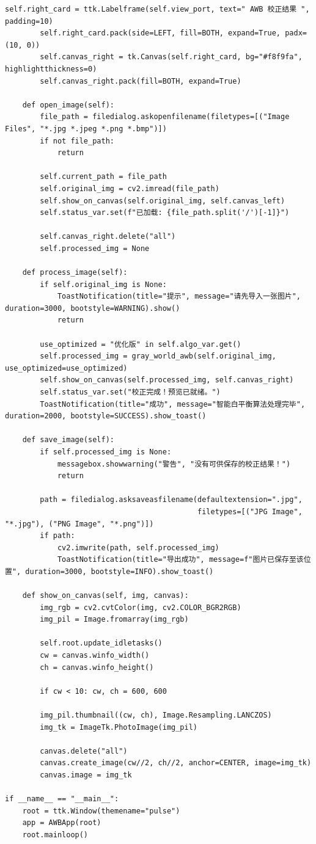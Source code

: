 \documentclass[12pt,a4paper,UTF8]{ctexart} %
\begin{document}
\begin{lstlisting}[caption={AWB可视化GUI代码（awb\_gui.py）}, label=code:gui]
        self.right_card = ttk.Labelframe(self.view_port, text=" AWB 校正结果 ", padding=10)
        self.right_card.pack(side=LEFT, fill=BOTH, expand=True, padx=(10, 0))
        self.canvas_right = tk.Canvas(self.right_card, bg="#f8f9fa", highlightthickness=0)
        self.canvas_right.pack(fill=BOTH, expand=True)

    def open_image(self):
        file_path = filedialog.askopenfilename(filetypes=[("Image Files", "*.jpg *.jpeg *.png *.bmp")])
        if not file_path:
            return
            
        self.current_path = file_path
        self.original_img = cv2.imread(file_path)
        self.show_on_canvas(self.original_img, self.canvas_left)
        self.status_var.set(f"已加载: {file_path.split('/')[-1]}")
        
        self.canvas_right.delete("all")
        self.processed_img = None

    def process_image(self):
        if self.original_img is None:
            ToastNotification(title="提示", message="请先导入一张图片", duration=3000, bootstyle=WARNING).show()
            return
            
        use_optimized = "优化版" in self.algo_var.get()
        self.processed_img = gray_world_awb(self.original_img, use_optimized=use_optimized)
        self.show_on_canvas(self.processed_img, self.canvas_right)
        self.status_var.set("校正完成！预览已就绪。")
        ToastNotification(title="成功", message="智能白平衡算法处理完毕", duration=2000, bootstyle=SUCCESS).show_toast()

    def save_image(self):
        if self.processed_img is None:
            messagebox.showwarning("警告", "没有可供保存的校正结果！")
            return
            
        path = filedialog.asksaveasfilename(defaultextension=".jpg", 
                                            filetypes=[("JPG Image", "*.jpg"), ("PNG Image", "*.png")])
        if path:
            cv2.imwrite(path, self.processed_img)
            ToastNotification(title="导出成功", message=f"图片已保存至该位置", duration=3000, bootstyle=INFO).show_toast()

    def show_on_canvas(self, img, canvas):
        img_rgb = cv2.cvtColor(img, cv2.COLOR_BGR2RGB)
        img_pil = Image.fromarray(img_rgb)
        
        self.root.update_idletasks()
        cw = canvas.winfo_width()
        ch = canvas.winfo_height()
        
        if cw < 10: cw, ch = 600, 600
        
        img_pil.thumbnail((cw, ch), Image.Resampling.LANCZOS)
        img_tk = ImageTk.PhotoImage(img_pil)
        
        canvas.delete("all")
        canvas.create_image(cw//2, ch//2, anchor=CENTER, image=img_tk)
        canvas.image = img_tk

if __name__ == "__main__":
    root = ttk.Window(themename="pulse")
    app = AWBApp(root)
    root.mainloop()
\end{lstlisting}
\end{document}
